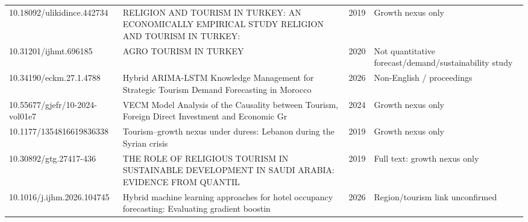 \begin{longtable}{@{}p{3.6cm}p{7.3cm}p{0.8cm}p{3.4cm}@{}}
10.18092/ulikidince.442734 & RELIGION AND TOURISM IN TURKEY: AN ECONOMICALLY EMPIRICAL STUDY RELIGION AND TOURISM IN TURKEY: & 2019 & Growth nexus only \\
10.31201/ijhmt.696185 & AGRO TOURISM IN TURKEY & 2020 & Not quantitative forecast/demand/sustainability study \\
10.34190/eckm.27.1.4788 & Hybrid ARIMA-LSTM Knowledge Management for Strategic Tourism Demand Forecasting in Morocco & 2026 & Non-English / proceedings \\
10.55677/gjefr/10-2024-vol01e7 & VECM Model Analysis of the Causality between Tourism, Foreign Direct Investment and Economic Gr & 2024 & Growth nexus only \\
10.1177/1354816619836338 & Tourism–growth nexus under duress: Lebanon during the Syrian crisis & 2019 & Growth nexus only \\
10.30892/gtg.27417-436 & THE ROLE OF RELIGIOUS TOURISM IN SUSTAINABLE DEVELOPMENT IN SAUDI ARABIA: EVIDENCE FROM QUANTIL & 2019 & Full text: growth nexus only \\
10.1016/j.ijhm.2026.104745 & Hybrid machine learning approaches for hotel occupancy forecasting: Evaluating gradient boostin & 2026 & Region/tourism link unconfirmed \\
\bottomrule
\end{longtable}
